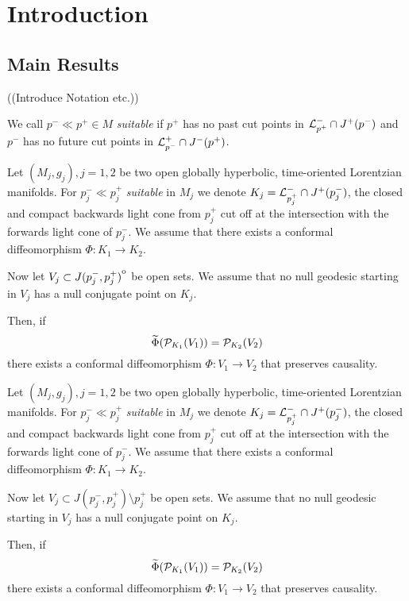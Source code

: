 \chapter{Introduction}

\section{Main Results}
((Introduce Notation etc.))

\begin{definition}[Suitable]
    We call $p^-\ll p^+\in M$ \emph{suitable} if $p^+$ has no past cut points in $\mathcal{L}^-_{p^+}\cap J^+(p^-)$ and $p^-$ has no future cut points in $\mathcal{L}^+_{p^-}\cap J^-(p^+)$.
\end{definition}

\begin{theorem}\label{thm:intreconstr}
    Let $(M_j,g_j), j=1,2$ be two open globally hyperbolic, time-oriented Lorentzian manifolds. For $p_j^-\ll p_j^+$ \emph{suitable} in $M_j$ we denote $K_j = \mathcal{L}^-_{p_j^+} \cap J^+(p_j^-)$, the closed and compact backwards light cone from $p_j^+$ cut off at the intersection with the forwards light cone of $p_j^-$. We assume that there exists a conformal diffeomorphism $\Phi:K_1\to K_2$. 
    
    Now let $V_j\subset{\kern0ptJ(p_j^-,p_j^+)}^{\mathrm{o}}$ be open sets. We assume that no null geodesic starting in $V_j$ has a null conjugate point on $K_j$. 
    
    Then, if 
    \[
    \widetilde{\Phi}(\mathcal{P}_{K_1}(V_1)) = \mathcal{P}_{K_2}(V_2)
    \]
    there exists a conformal diffeomorphism $\Phi:V_1\to V_2$ that preserves causality.
\end{theorem}


\begin{theorem}\label{thm:bdreconstr}
    Let $(M_j,g_j), j=1,2$ be two open globally hyperbolic, time-oriented Lorentzian manifolds. For $p_j^-\ll p_j^+$ \emph{suitable} in $M_j$ we denote $K_j = \mathcal{L}^-_{p_j^+} \cap J^+(p_j^-)$, the closed and compact backwards light cone from $p_j^+$ cut off at the intersection with the forwards light cone of $p_j^-$. We assume that there exists a conformal diffeomorphism $\Phi:K_1\to K_2$. 
    
    Now let $V_j\subset J(p_j^-,p_j^+) \setminus p_j^+$ be open sets. We assume that no null geodesic starting in $V_j$ has a null conjugate point on $K_j$. 
    
    Then, if 
    \[
    \widetilde{\Phi}(\mathcal{P}_{K_1}(V_1)) = \mathcal{P}_{K_2}(V_2)
    \]
    there exists a conformal diffeomorphism $\Phi:V_1\to V_2$ that preserves causality.
\end{theorem}